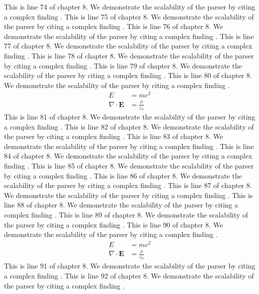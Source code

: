 This is line 74 of chapter 8. We demonstrate the scalability of the parser by citing a complex finding \cite{ref8_74}.
This is line 75 of chapter 8. We demonstrate the scalability of the parser by citing a complex finding \cite{ref8_75}.
This is line 76 of chapter 8. We demonstrate the scalability of the parser by citing a complex finding \cite{ref8_76}.
This is line 77 of chapter 8. We demonstrate the scalability of the parser by citing a complex finding \cite{ref8_77}.
This is line 78 of chapter 8. We demonstrate the scalability of the parser by citing a complex finding \cite{ref8_78}.
This is line 79 of chapter 8. We demonstrate the scalability of the parser by citing a complex finding \cite{ref8_79}.
This is line 80 of chapter 8. We demonstrate the scalability of the parser by citing a complex finding \cite{ref8_80}.
\begin{align*}
  E &= mc^2 \\
  \nabla \cdot \mathbf{E} &= \frac{\rho}{\varepsilon_0}
\end{align*}
This is line 81 of chapter 8. We demonstrate the scalability of the parser by citing a complex finding \cite{ref8_81}.
This is line 82 of chapter 8. We demonstrate the scalability of the parser by citing a complex finding \cite{ref8_82}.
This is line 83 of chapter 8. We demonstrate the scalability of the parser by citing a complex finding \cite{ref8_83}.
This is line 84 of chapter 8. We demonstrate the scalability of the parser by citing a complex finding \cite{ref8_84}.
This is line 85 of chapter 8. We demonstrate the scalability of the parser by citing a complex finding \cite{ref8_85}.
This is line 86 of chapter 8. We demonstrate the scalability of the parser by citing a complex finding \cite{ref8_86}.
This is line 87 of chapter 8. We demonstrate the scalability of the parser by citing a complex finding \cite{ref8_87}.
This is line 88 of chapter 8. We demonstrate the scalability of the parser by citing a complex finding \cite{ref8_88}.
This is line 89 of chapter 8. We demonstrate the scalability of the parser by citing a complex finding \cite{ref8_89}.
This is line 90 of chapter 8. We demonstrate the scalability of the parser by citing a complex finding \cite{ref8_90}.
\begin{align*}
  E &= mc^2 \\
  \nabla \cdot \mathbf{E} &= \frac{\rho}{\varepsilon_0}
\end{align*}
This is line 91 of chapter 8. We demonstrate the scalability of the parser by citing a complex finding \cite{ref8_91}.
This is line 92 of chapter 8. We demonstrate the scalability of the parser by citing a complex finding \cite{ref8_92}.
